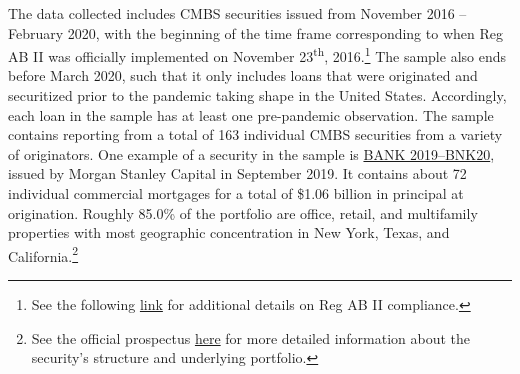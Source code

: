 \documentclass[11pt]{article} %
\begin{document}
The data collected includes CMBS securities issued from November 2016 -- February 2020, with the beginning of the time frame corresponding to when Reg AB II was officially implemented on November 23\textsuperscript{th}, 2016.\footnote{See the following \href{https://www.sec.gov/oit/announcement/regabii-asset-level-requirements-compliance.html}{link} for additional details on Reg AB II compliance.} The sample also ends before March 2020, such that it only includes loans that were originated and securitized prior to the pandemic taking shape in the United States. Accordingly, each loan in the sample has at least one pre-pandemic observation. The sample contains reporting from a total of 163 individual CMBS securities from a variety of originators. One example of a security in the sample is \href{https://www.sec.gov/edgar/browse/?CIK=0001784958}{BANK 2019--BNK20}, issued by Morgan Stanley Capital in September 2019. It contains about 72 individual commercial mortgages for a total of \$1.06 billion in principal at origination. Roughly 85.0\% of the portfolio are office, retail, and multifamily properties with most geographic concentration in New York, Texas, and California.\footnote{See the official prospectus \href{https://www.sec.gov/Archives/edgar/data/0001784958/000153949719001606/n1759-x13_424b2.htm}{here} for more detailed information about the security's structure and underlying portfolio. } 
\end{document}
